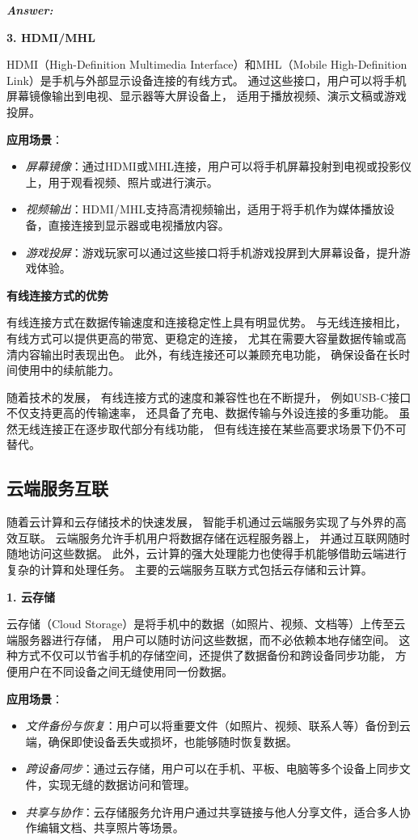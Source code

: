 \documentclass[12pt]{article}
\newenvironment{Answer}{
  \vspace{12pt}
  {\large\textbf{\textit{\hspace{-12pt}Answer:}}}\par
  \vspace{8pt}
} {\vspace{24pt}}
\begin{document}
\begin{Answer}
\noindent\textbf{3. HDMI/MHL}\noindent

HDMI（High-Definition Multimedia Interface）和MHL（Mobile High-Definition Link）是手机与外部显示设备连接的有线方式。
通过这些接口，用户可以将手机屏幕镜像输出到电视、显示器等大屏设备上，
适用于播放视频、演示文稿或游戏投屏。

\textbf{应用场景}：
\begin{itemize}
    \item \textit{屏幕镜像}：通过HDMI或MHL连接，用户可以将手机屏幕投射到电视或投影仪上，用于观看视频、照片或进行演示。
    \item \textit{视频输出}：HDMI/MHL支持高清视频输出，适用于将手机作为媒体播放设备，直接连接到显示器或电视播放内容。
    \item \textit{游戏投屏}：游戏玩家可以通过这些接口将手机游戏投屏到大屏幕设备，提升游戏体验。
\end{itemize}

\noindent\textbf{有线连接方式的优势}\noindent

有线连接方式在数据传输速度和连接稳定性上具有明显优势。
与无线连接相比，
有线方式可以提供更高的带宽、更稳定的连接，
尤其在需要大容量数据传输或高清内容输出时表现出色。
此外，有线连接还可以兼顾充电功能，
确保设备在长时间使用中的续航能力。

随着技术的发展，
有线连接方式的速度和兼容性也在不断提升，
例如USB-C接口不仅支持更高的传输速率，
还具备了充电、数据传输与外设连接的多重功能。
虽然无线连接正在逐步取代部分有线功能，
但有线连接在某些高要求场景下仍不可替代。

\subsection*{云端服务互联}\noindent

随着云计算和云存储技术的快速发展，
智能手机通过云端服务实现了与外界的高效互联。
云端服务允许手机用户将数据存储在远程服务器上，
并通过互联网随时随地访问这些数据。
此外，云计算的强大处理能力也使得手机能够借助云端进行复杂的计算和处理任务。
主要的云端服务互联方式包括云存储和云计算。

\noindent\textbf{1. 云存储}\noindent

云存储（Cloud Storage）是将手机中的数据（如照片、视频、文档等）上传至云端服务器进行存储，
用户可以随时访问这些数据，而不必依赖本地存储空间。
这种方式不仅可以节省手机的存储空间，还提供了数据备份和跨设备同步功能，
方便用户在不同设备之间无缝使用同一份数据。

\textbf{应用场景}：
\begin{itemize}
    \item \textit{文件备份与恢复}：用户可以将重要文件（如照片、视频、联系人等）备份到云端，确保即使设备丢失或损坏，也能够随时恢复数据。
    \item \textit{跨设备同步}：通过云存储，用户可以在手机、平板、电脑等多个设备上同步文件，实现无缝的数据访问和管理。
    \item \textit{共享与协作}：云存储服务允许用户通过共享链接与他人分享文件，适合多人协作编辑文档、共享照片等场景。
\end{itemize}


\end{Answer}
\end{document}
